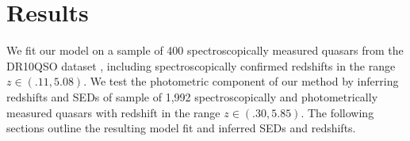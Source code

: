 \documentclass{article} %
\begin{document}
\section{Results}
\label{sec:experiments}
We fit our model on a sample of 400 spectroscopically measured quasars from the DR10QSO dataset \cite{paris2014sloan}, including spectroscopically confirmed redshifts in the range ${z \in (.11,  5.08)}$.  
We test the photometric component of our method by inferring redshifts and SEDs of sample of 1,992 spectroscopically and photometrically measured quasars with redshift in the range ${z \in (.30, 5.85)}$.  
The following sections outline the resulting model fit and inferred SEDs and redshifts. 
\end{document}
